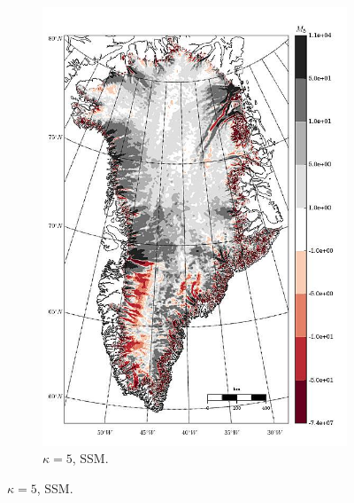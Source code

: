 \begin{figure}
\begin{subfigure}[b]{0.25\linewidth}
    \includegraphics[width=\linewidth]{images/balance_velocity/greenland/misfit_5H_kappa_5_SSM.jpg}
  \caption{$\kappa = 5$, SSM.}
  \label{greenland_bv_image_kappa_5_SSM_misfit}
  \end{subfigure}


\end{figure}
